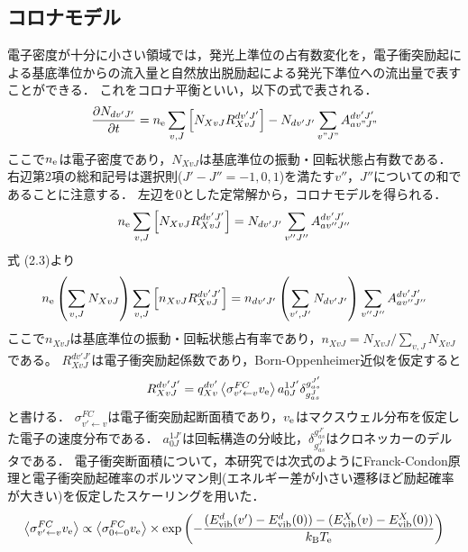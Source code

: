 \subsection{コロナモデル}
電子密度が十分に小さい領域では，発光上準位の占有数変化を，電子衝突励起による基底準位からの流入量と自然放出脱励起による発光下準位への流出量で表すことができる．
これをコロナ平衡といい，以下の式で表される\cite{PRnoijousei}．
\begin{equation}
    \frac{\partial N_{dv'J'}}{\partial t} = n_{\rm e} \sum_{v, J} \left[ N_{XvJ} R^{dv'J'}_{XvJ} \right] - N_{dv'J'} \sum_{v"J"} A^{dv'J'}_{av"J"}
\end{equation}
ここで$n_{\rm e}$は電子密度であり，$N_{XvJ}$は基底準位の振動・回転状態占有数である．
右辺第2項の総和記号は選択則($J'-J''=-1,0,1$)を満たす$v''，J''$についての和であることに注意する．
左辺を0とした定常解から，コロナモデルを得られる．
\begin{equation}
    n_{\rm e} \sum_{v, J} \left[ N_{XvJ} R^{dv'J'}_{XvJ} \right] = N_{dv'J'} \sum_{v''J''} A^{dv'J'}_{av''J''}
\end{equation}
式 (2.3)より
\begin{equation}
    n_{\rm e} \left( \sum_{v, J} N_{XvJ} \right) \sum_{v, J} \left[ n_{XvJ} R^{dv'J'}_{XvJ} \right] = n_{dv'J'} \left( \sum_{v', J'} N_{dv'J'} \right) \sum_{v''J''} A^{dv'J'}_{av''J''}
\end{equation}
ここで$n_{XvJ}$は基底準位の振動・回転状態占有率であり，$n_{XvJ} = N_{XvJ} / \sum_{v,J} N_{XvJ}$である。
$R^{dv'J'}_{XvJ}$は電子衝突励起係数であり，Born-Oppenheimer近似を仮定すると
\begin{equation}
    R^{dv'J'}_{XvJ} = q^{dv'}_{Xv} \left< \sigma^{FC}_{v' \leftarrow v} v_{\rm e} \right> a^{1J'}_{0J} \delta^{g^{J'}_{as}}_{g^J_{as}}
\end{equation}
と書ける\cite{PRnoijousei}．
$\sigma^{FC}_{v' \leftarrow v}$は電子衝突励起断面積であり，$v_{\rm e}$はマクスウェル分布を仮定した電子の速度分布である．
$a^{1J'}_{0J}$は回転構造の分岐比，$\delta^{g^{J'}_{as}}_{g^J_{as}}$はクロネッカーのデルタである．
電子衝突断面積について，本研究では次式のようにFranck-Condon原理と電子衝突励起確率のボルツマン則(エネルギー差が小さい遷移ほど励起確率が大きい)を仮定したスケーリングを用いた\cite{kyokaisou}．
\begin{equation}
    \left< \sigma^{FC}_{v' \leftarrow v} v_{\rm e} \right> \propto \left< \sigma^{FC}_{0 \leftarrow 0} v_{\rm e} \right> \times \exp \left( -\frac{(E^d_{\rm vib} (v') - E^d_{\rm vib} (0))-(E^X_{\rm vib} (v) - E^X_{\rm vib} (0))}{k_{\rm B} T_{\rm e}} \right)
\end{equation}
